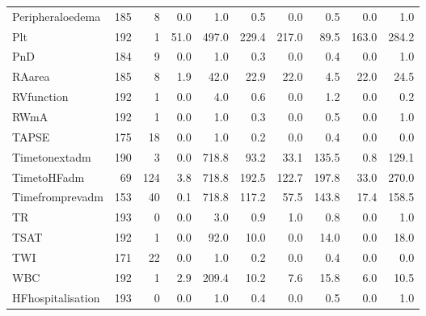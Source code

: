 \begin{footnotesize}
\begin{tabularx}{\textwidth}{P{2.4cm}RRRRRRRRR}
Peripheraloedema & 185 &   8 &   0.0 &     1.0 &    0.5 &    0.0 &    0.5 &   0.0 &    1.0 \\ 
Plt & 192 &   1 &  51.0 &   497.0 &  229.4 &  217.0 &   89.5 & 163.0 &  284.2 \\ 
PnD & 184 &   9 &   0.0 &     1.0 &    0.3 &    0.0 &    0.4 &   0.0 &    1.0 \\ 
RAarea & 185 &   8 &   1.9 &    42.0 &   22.9 &   22.0 &    4.5 &  22.0 &   24.5 \\ 
RVfunction & 192 &   1 &   0.0 &     4.0 &    0.6 &    0.0 &    1.2 &   0.0 &    0.2 \\ 
RWmA & 192 &   1 &   0.0 &     1.0 &    0.3 &    0.0 &    0.5 &   0.0 &    1.0 \\ 
TAPSE & 175 &  18 &   0.0 &     1.0 &    0.2 &    0.0 &    0.4 &   0.0 &    0.0 \\ 
Timetonextadm & 190 &   3 &   0.0 &   718.8 &   93.2 &   33.1 &  135.5 &   0.8 &  129.1 \\ 
TimetoHFadm &  69 & 124 &   3.8 &   718.8 &  192.5 &  122.7 &  197.8 &  33.0 &  270.0 \\ 
Timefromprevadm & 153 &  40 &   0.1 &   718.8 &  117.2 &   57.5 &  143.8 &  17.4 &  158.5 \\ 
TR & 193 &   0 &   0.0 &     3.0 &    0.9 &    1.0 &    0.8 &   0.0 &    1.0 \\ 
TSAT & 192 &   1 &   0.0 &    92.0 &   10.0 &    0.0 &   14.0 &   0.0 &   18.0 \\ 
TWI & 171 &  22 &   0.0 &     1.0 &    0.2 &    0.0 &    0.4 &   0.0 &    0.0 \\ 
WBC & 192 &   1 &   2.9 &   209.4 &   10.2 &    7.6 &   15.8 &   6.0 &   10.5 \\ 
HFhospitalisation & 193 &   0 &   0.0 &     1.0 &    0.4 &    0.0 &    0.5 &   0.0 &    1.0 \\ 
\midrule
\end{tabularx}
\end{footnotesize}